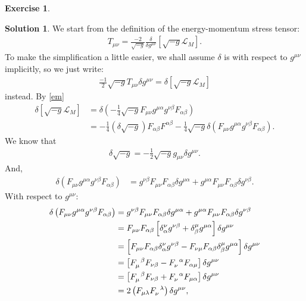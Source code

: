 \documentclass[a4paper,11pt]{article}
\numberwithin{equation}{section}
\theoremstyle{definition}
\newtheorem{exmp}{Exercise}[section]
\newtheorem{sln}{Solution}[section]
\newcommand{\lag}{\mathcal{L}}
\newcommand{\nn}{\nonumber}
\newcommand{\f}[2]{\frac{#1}{#2}}
\newcommand{\lp}{\left(}
\newcommand{\rp}{\right)}
\newcommand{\lb}{\left[}
\newcommand{\rb}{\right]}
\begin{document}
\begin{exmp}
	\begin{sln}
		We start from the definition of the energy-momentum stress tensor:
		\begin{align}
		T_{\mu\nu} = \f{-2}{\sqrt{-g}}\f{\delta}{\delta g^{\mu\nu}} \lb \sqrt{-g}\lag_M \rb.
		\end{align}
		To make the simplification a little easier, we shall assume $\delta$ is with respect to $g^{\mu\nu}$ implicitly, so we just write:
		\begin{align}
		\f{-1}{2}\sqrt{-g}T_{\mu\nu}\delta g^{\mu\nu} = \delta\lb \sqrt{-g}\lag_M \rb
		\end{align}
		instead. By \eqref{em}
		\begin{align}
		\delta\lb \sqrt{-g}\lag_M \rb &= \delta \lp  -\f{1}{4}\sqrt{-g}F_{\mu\nu}g^{\mu\alpha}g^{\nu\beta}F_{\alpha\beta} \rp \nn\\
		&= -\f{1}{4}(\delta \sqrt{-g})F_{\alpha\beta}F^{\alpha\beta} -\f{1}{4}\sqrt{-g}\delta\lp F_{\mu\nu}g^{\mu\alpha}g^{\nu\beta}F_{\alpha\beta} \rp.
		\end{align}
		We know that
		\begin{align}
		\delta \sqrt{-g} = -\f{1}{2}\sqrt{-g} g_{\mu\nu}\delta g^{\mu\nu}.
		\end{align}
		And,
		\begin{align}
		\delta \lp F_{\mu\nu}g^{\mu\alpha}g^{\nu\beta}F_{\alpha\beta} \rp &= g^{\nu\beta}F_{\mu\nu}F_{\alpha\beta}\delta g^{\mu\alpha} + g^{\mu\alpha}F_{\mu\nu}F_{\alpha\beta}\delta g^{\nu\beta}.
		\end{align}
		With respect to $g^{\mu\nu}$:
		\begin{align}
		\delta \lp F_{\mu\nu}g^{\mu\alpha}g^{\nu\beta}F_{\alpha\beta} \rp
		&= g^{\nu\beta}F_{\mu\nu}F_{\alpha\beta}\delta g^{\mu\alpha} + g^{\mu\alpha}F_{\mu\nu}F_{\alpha\beta}\delta g^{\nu\beta}\nn\\
		&= F_{\mu\nu}F_{\alpha\beta}\lb \delta ^\nu_\alpha g^{\nu\beta} + \delta^\mu_\beta g^{\mu\alpha} \rb \delta g^{\mu\nu}\nn\\
		&= \lb F_{\mu\nu}F_{\alpha\beta}\delta^\nu_\alpha g^{\nu\beta} - F_{\nu\mu}F_{\alpha\beta}\delta^\mu_\beta g^{\mu\alpha} \rb\delta g^{\mu\nu}\nn\\
		&= \lb \tensor{F}{_\mu^\beta}F_{\nu\beta} - \tensor{F}{_\nu^\alpha}F_{\alpha\mu} \rb\delta g^{\mu\nu}\nn\\
		&= \lb \tensor{F}{_\mu^\beta}F_{\nu\beta} + \tensor{F}{_\nu^\alpha}F_{\mu\alpha} \rb\delta g^{\mu\nu}\nn\\
		&= 2\lp F_{\mu\lambda} \tensor{F}{_\nu^\lambda} \rp \delta g^{\mu\nu},

\end{align}
\end{sln}
\end{exmp}
\end{document}
